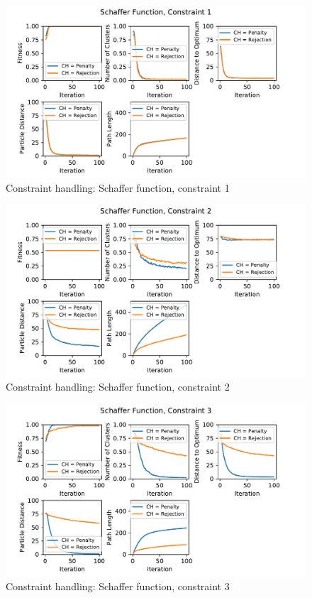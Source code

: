 \documentclass[12pt]{article}
\begin{document}
\begin{figure}[h!]
	\centering
	\includegraphics[width=1\textwidth]{figures/ex6/ex6-1-Constraint_1.pdf}
	\caption{Constraint handling: Schaffer function, constraint 1}
	\label{fig:ex6-1-1}
\end{figure}
\begin{figure}[h!]
	\centering
	\includegraphics[width=1\textwidth]{figures/ex6/ex6-1-Constraint_2.pdf}
	\caption{Constraint handling: Schaffer function, constraint 2}
	\label{fig:ex6-1-2}
\end{figure}
\begin{figure}[h!]
	\centering
	\includegraphics[width=1\textwidth]{figures/ex6/ex6-1-Constraint_3.pdf}
	\caption{Constraint handling: Schaffer function, constraint 3}
	\label{fig:ex6-1-3}
\end{figure}
\end{document}

